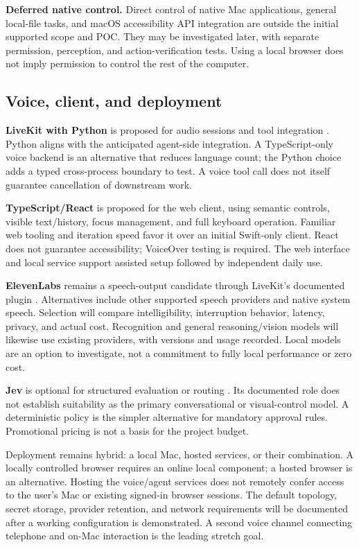 \documentclass[11pt]{article}
\begin{document}
\textbf{Deferred native control.} Direct control of native Mac applications,
general local-file tasks, and macOS accessibility API integration are outside the
initial supported scope and POC. They may be investigated later, with separate
permission, perception, and action-verification tests. Using a local browser does
not imply permission to control the rest of the computer.

\subsection{Voice, client, and deployment}
\textbf{LiveKit with Python} is proposed for audio sessions and tool integration
\citep{LiveKitStart,LiveKitTools}. Python aligns with the anticipated agent-side
integration. A TypeScript-only voice backend is an alternative that reduces
language count; the Python choice adds a typed cross-process boundary to test.
A voice tool call does not itself guarantee cancellation of downstream work.

\textbf{TypeScript/React} is proposed for the web client, using semantic controls,
visible text/history, focus management, and full keyboard operation. Familiar web
tooling and iteration speed favor it over an initial Swift-only client. React
does not guarantee accessibility; VoiceOver testing is required. The web interface
and local service support assisted setup followed by independent daily use.

\textbf{ElevenLabs} remains a speech-output candidate through LiveKit's documented
plugin \citep{ElevenLabsPlugin}. Alternatives include other supported speech
providers and native system speech. Selection will compare intelligibility,
interruption behavior, latency, privacy, and actual cost. Recognition and general
reasoning/vision models will likewise use existing providers, with versions and
usage recorded. Local models are an option to investigate, not a commitment to
fully local performance or zero cost.

\textbf{Jev} is optional for structured evaluation or routing
\citep{Jev}. Its documented role does not establish suitability as the primary
conversational or visual-control model. A deterministic policy is the simpler
alternative for mandatory approval rules. Promotional pricing is not a basis
for the project budget.

Deployment remains hybrid: a local Mac, hosted services, or their combination.
A locally controlled browser requires an online local component; a hosted browser
is an alternative. Hosting the voice/agent services does not remotely confer
access to the user's Mac or existing signed-in browser sessions.
The default topology, secret storage, provider retention, and network requirements
will be documented after a working configuration is demonstrated. A second voice
channel connecting telephone and on-Mac interaction is the leading stretch goal.
\end{document}
